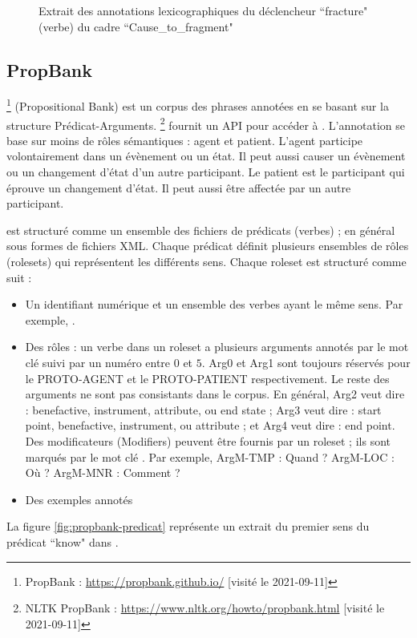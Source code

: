 \documentclass{KodeBook}
\begin{document}
\begin{figure}[!ht]
	\caption[Extrait des annotations lexicographiques dans FrameNet]{Extrait des annotations lexicographiques du déclencheur ``fracture" (verbe) du cadre ``Cause\_to\_fragment"}
	\label{fig:framenet-lex}
\end{figure}

\subsection{PropBank}

\footnote{PropBank : \url{https://propbank.github.io/} [visité le 2021-09-11]} (Propositional Bank) est un corpus des phrases annotées en se basant sur la structure Prédicat-Arguments. 
\footnote{NLTK PropBank : \url{https://www.nltk.org/howto/propbank.html} [visité le 2021-09-11]} fournit un API pour accéder à . 
L'annotation se base sur moins de rôles sémantiques : agent et patient. 
L'agent participe volontairement dans un évènement ou un état.
Il peut aussi causer un évènement ou un changement d'état d'un autre participant. 
Le patient est le participant qui éprouve un changement d'état.
Il peut aussi être affectée par un autre participant.


 est structuré comme un ensemble des fichiers de prédicats (verbes) ; en général sous formes de fichiers XML. 
Chaque prédicat définit plusieurs ensembles de rôles (rolesets) qui représentent les différents sens.
Chaque roleset est structuré comme suit : 
\begin{itemize}
	\item Un identifiant numérique et un ensemble des verbes ayant le même sens.
	Par exemple, .
	
	\item Des rôles : un verbe dans un roleset a plusieurs arguments annotés par le mot clé  suivi par un numéro entre $0$ et $5$. 
	Arg0 et Arg1 sont toujours réservés pour le PROTO-AGENT et le PROTO-PATIENT respectivement. 
	Le reste des arguments ne sont pas consistants dans le corpus. 
	En général, Arg2 veut dire : benefactive, instrument, attribute, ou end state ; Arg3 veut dire : start point, benefactive, instrument, ou attribute ; et Arg4 veut dire : end point.
	Des modificateurs (Modifiers) peuvent être fournis par un roleset ; ils sont marqués par le mot clé . 
	Par exemple, ArgM-TMP : Quand ? ArgM-LOC : Où ? ArgM-MNR : Comment ?
	\item Des exemples annotés
\end{itemize} 
La figure \ref{fig:propbank-predicat} représente un extrait du premier sens du prédicat ``know" dans .
\end{document}
